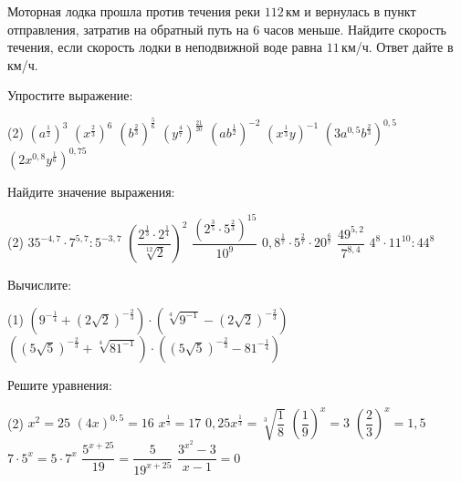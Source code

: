 \begin{class}[number=3]
\begin{listofex}
		\item Моторная лодка прошла против течения реки \(112\) км и вернулась в пункт отправления, затратив на обратный путь на \(6\) часов меньше. Найдите скорость течения, если скорость лодки в неподвижной воде равна \(11\) км/ч. Ответ дайте в км/ч.
	\end{listofex}
\end{class}

\begin{class}[number=4]
	\begin{listofex}
		\item Упростите выражение:
		\begin{tasks}(2)
			\task \( (a^{\tfrac{1}{2}})^3 \)
			\task \( (x^{\tfrac{2}{3}})^6 \)
			\task \( (b^{\tfrac{2}{3}})^{\tfrac{5}{6}} \)
			\task \( (y^{\tfrac{4}{7}})^{\tfrac{21}{20}} \)
			\task \( (ab^{\tfrac{1}{2}})^{-2} \)
			\task \( (x^{\tfrac{1}{3}}y)^{-1} \)
			\task \( (3a^{0,5}b^{\tfrac{2}{3}})^{0,5} \)
			\task \( (2x^{0,8}y^{\tfrac{1}{6}})^{0,75} \)
		\end{tasks}
		\item Найдите значение выражения:
		\begin{tasks}(2)
			\task \( 35^{-4,7} \cdot 7^{5,7} : 5^{-3,7} \)
			\task \( \left( \dfrac{2^{\tfrac{1}{3}}\cdot2^{\tfrac{1}{4}}}{\sqrt[12]{2}} \right)^2 \)
			\task \( \dfrac{(2^\tfrac{3}{5}\cdot5^{\tfrac{2}{3}})^{15}}{10^9} \)
			\task \( 0,8^{\tfrac{1}{7}}\cdot5^{\tfrac{2}{7}}\cdot20^{\tfrac{6}{7}} \)
			\task \( \dfrac{49^{5,2}}{7^{8,4}} \)
			\task \( 4^8\cdot11^{10}:44^8 \)
		\end{tasks}
		\item Вычислите:
		\begin{tasks}(1)
			\task \( ( 9^{-\tfrac{1}{4}}+(2\sqrt{2})^{-\tfrac{2}{3}} ) \cdot ( \sqrt[4]{9^{-1}} - (2\sqrt{2})^{-\tfrac{2}{3}} ) \)
			\task \( ( (5\sqrt{5})^{-\tfrac{2}{3}} + \sqrt[4]{81^{-1}} ) \cdot ( (5\sqrt{5})^{-\tfrac{2}{3}} - 81^{-\tfrac{1}{4}} ) \)
		\end{tasks}
		\item Решите уравнения:
		\begin{tasks}(2)
			\task \( x^2 = 25 \)
			\task \( (4x)^{0,5} = 16 \)
			\task \( x^{\tfrac{1}{3}} = 17 \)
			\task \( 0,25x^{\tfrac{1}{3}} = \sqrt[3]{\dfrac{1}{8}} \)
			\task \( \left( \dfrac{1}{9} \right)^x=3 \)
			\task \( \left( \dfrac{2}{3} \right)^x=1,5 \)
			\task \( 7 \cdot 5^x = 5 \cdot 7^x \)
			\task \( \dfrac{5^{x+25}}{19}=\dfrac{5}{19^{x+25}} \)
			\task \( \dfrac{3^{x^2}-3}{x-1}=0 \)

\end{tasks}
\end{listofex}
\end{class}
